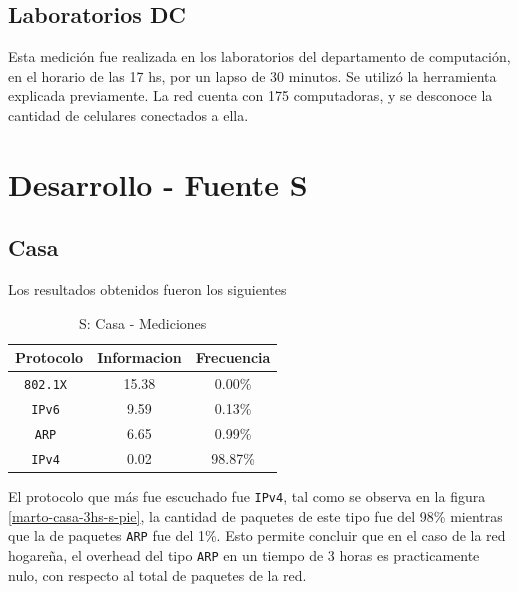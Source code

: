 \documentclass[final,inline,a4paper,narroweqnarray]{ieee}
\let\Oldsection\section
\renewcommand{\section}{\FloatBarrier\Oldsection}
\let\Oldsubsection\subsection
\renewcommand{\subsection}{\FloatBarrier\Oldsubsection}
\begin{document}
\subsection{Laboratorios DC}

  Esta medición fue realizada en los laboratorios del departamento de
  computación, en el horario de las 17 hs, por un lapso de 30 minutos.
  Se utilizó la herramienta explicada previamente. La red cuenta con
  175 computadoras, y se desconoce la cantidad de celulares conectados
  a ella.

\section{Desarrollo - Fuente S}
  \subsection{Casa}

   Los resultados obtenidos fueron los siguientes

  \begin{table}[ht]\begin{center}
      \begin{tabular}{|c|c|c|}
      \hline
      \textbf{Protocolo} & \textbf{Informacion} & \textbf{Frecuencia} \\ \hline
      \texttt{802.1X    }& 15.38       & 0.00\%     \\ \hline
      \texttt{IPv6      }& 9.59        & 0.13\%     \\ \hline
      \texttt{ARP       }& 6.65        & 0.99\%     \\ \hline
      \texttt{IPv4      }& 0.02        & 98.87\%    \\ \hline
      \end{tabular}
      \caption{S: Casa - Mediciones}
      \label{casa-s-table}
  \end{center}\end{table}

    El protocolo que más fue escuchado fue \texttt{IPv4}, tal como se
    observa en la figura \ref{marto-casa-3hs-s-pie}, la cantidad de
    paquetes  de este tipo fue del 98\% mientras que la de paquetes
    \texttt{ARP} fue del 1\%. Esto permite concluir que en el caso de
    la red hogareña, el overhead del tipo \texttt{ARP} en un tiempo de
    3 horas es practicamente nulo, con respecto al total de paquetes
    de la red.
\end{document}
